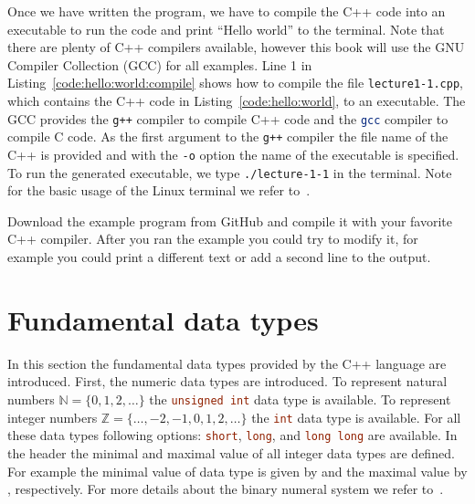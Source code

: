 Once we have written the program, we have to compile the C++ code into an executable to run the code and print ``Hello world'' to the terminal. Note that there are plenty of C++ compilers available, however this book will use the GNU Compiler Collection (GCC) for all examples. Line 1 in Listing~\ref{code:hello:world:compile} shows how to compile the file \lstinline[language=bash]|lecture1-1.cpp|, which contains the C++ code in Listing~\ref{code:hello:world}, to an executable. The GCC provides the \lstinline[language=bash]{g++} compiler to compile C++ code and the \lstinline[language=bash]{gcc} compiler to compile C code. As the first argument to the \lstinline[language=bash]{g++} compiler the file name of the C++ is provided and with the \lstinline[language=bash]|-o| option the name of the executable is specified. To run the generated executable, we type \lstinline[language=bash]|./lecture-1-1| in the terminal. Note for the basic usage of the Linux terminal we refer to~\cite{newham2005learning,robbins2016bash}.



\begin{exercise}
Download the example program from GitHub and compile it with your favorite C++ compiler. After you ran the example you could try to modify it, for example you could print a different text or add a second line to the output.
\end{exercise}


\section{Fundamental data types}
\label{sec:fundamental:types}
In this section the fundamental data types provided by the C++ language are introduced. First, the numeric data types are introduced. To represent natural numbers $\mathbb{N}=\{0,1,2,\ldots \}$ the \lstinline[language=C++]|unsigned int| data type is available. To represent integer numbers $\mathbb{Z}=\{\ldots,-2,-1,0,1,2,\ldots \}$ the \lstinline[language=C++]|int| data type is available. For all these data types following options: \lstinline[language=C++]|short|, \lstinline[language=C++]|long|, and \lstinline[language=C++]|long long| are available. In the  header the minimal and maximal value of all integer data types are defined. For example the minimal value of  data type is given by  and the maximal value by , respectively. For more details about the binary numeral system we refer to~\cite{gilli1965binary}. 

